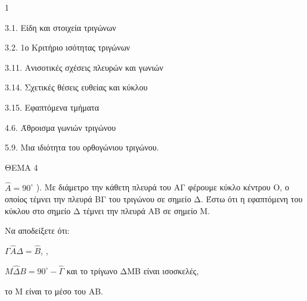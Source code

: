 \begin{ylh}{1}
    \item 3.1. Είδη και στοιχεία τριγώνων
    \item 3.2. 1ο Κριτήριο ισότητας τριγώνων
    \item 3.11. Ανισοτικές σχέσεις πλευρών και γωνιών
    \item 3.14. Σχετικές θέσεις ευθείας και κύκλου
    \item 3.15. Εφαπτόμενα τμήματα
    \item 4.6. Άθροισμα γωνιών τριγώνου
    \item 5.9. Μια ιδιότητα του ορθογώνιου τριγώνου.
\end{ylh}

ΘΕΜΑ 4

$\widehat{Α}=90^{\circ}$
). Με διάμετρο την κάθετη πλευρά του ΑΓ φέρουμε κύκλο κέντρου Ο, ο οποίος τέμνει την πλευρά ΒΓ του τριγώνου σε σημείο Δ. Έστω ότι η εφαπτόμενη του κύκλου στο σημείο Δ τέμνει την πλευρά ΑΒ σε σημείο Μ.

Να αποδείξετε ότι:

\begin{alist}
\item $\Gamma\widehat{Α}\Delta = \widehat{Β}$, 
, 

\item $Μ\widehat{\Delta}Β = 90^{\circ} - \widehat{\Gamma}$
 και το τρίγωνο ΔΜΒ είναι ισοσκελές, 

\item το Μ είναι το μέσο του ΑΒ. 


\begin{center}
\end{center}
\end{alist}
